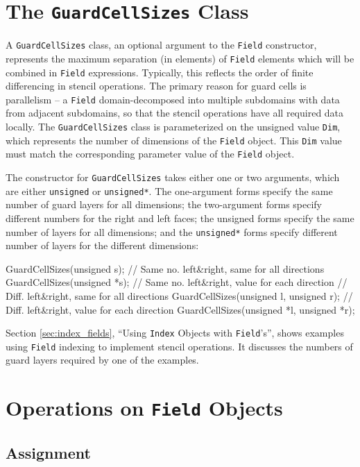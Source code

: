 \section{The \texttt{GuardCellSizes} Class}

A \texttt{GuardCellSizes} class, an optional argument to the \texttt{Field} constructor, represents the maximum separation (in elements) of \texttt{Field} elements which will be combined in \texttt{Field} expressions. Typically, this reflects the order of finite differencing in stencil operations. The primary reason for guard cells is parallelism -- a \texttt{Field} domain-decomposed into multiple subdomains with data from adjacent subdomains, so that the stencil operations
have all required data locally. The \texttt{GuardCellSizes}
class is parameterized on the unsigned value \texttt{Dim}, which represents the number of dimensions of the \texttt{Field} object. This \texttt{Dim} value must match the corresponding parameter value of the \texttt{Field} object.

The constructor for \texttt{GuardCellSizes} takes either one or two arguments, which are either \texttt{unsigned} or \texttt{unsigned*}. The one-argument forms specify the same number of guard layers for all dimensions; the two-argument forms specify different numbers for the right and left faces; the unsigned forms specify the same number of layers for all dimensions; and the \texttt{unsigned*} forms specify different number of layers for the different dimensions: 
\begin{smallcode}
GuardCellSizes(unsigned s);  // Same no. left&right, same for all directions
GuardCellSizes(unsigned *s); // Same no. left&right, value for each direction
// Diff. left&right, same for all directions
GuardCellSizes(unsigned l, unsigned r); 
// Diff. left&right, value for each direction
GuardCellSizes(unsigned *l, unsigned *r); 
\end{smallcode}

Section \ref{sec:index_fields}, ``Using \texttt{Index} Objects with \texttt{Field}'s'', shows examples using \texttt{Field} indexing to implement stencil operations. It discusses the numbers of guard layers required by one of the examples.

\section{Operations on \texttt{Field} Objects}

\subsection{Assignment}

